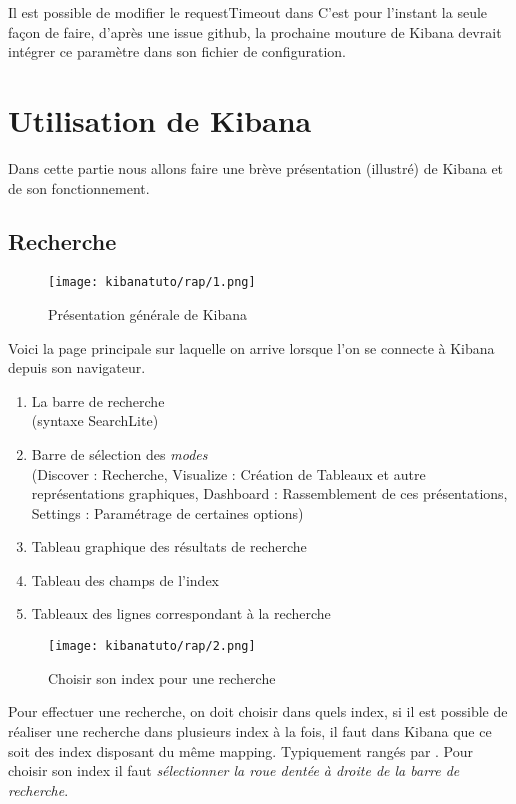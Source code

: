Il est possible de modifier le requestTimeout dans 
C'est pour l'instant la seule façon de faire, d'après une issue github, la prochaine 
mouture de Kibana devrait intégrer ce paramètre dans son fichier de configuration.

\section{Utilisation de Kibana}
Dans cette partie nous allons faire une brève présentation (illustré) de Kibana et
de son fonctionnement.

\subsection{Recherche}
\begin{figure}[H]
\center
\texttt{[image: kibanatuto/rap/1.png]}
\label{fig:kibanatuto1}
\caption{Présentation générale de Kibana}
\end{figure}

Voici la page principale sur laquelle on arrive lorsque l'on se connecte à Kibana
depuis son navigateur.

\begin{enumerate}
    \item La barre de recherche \\(syntaxe SearchLite)
    \item Barre de sélection des \emph{modes} \\(Discover : Recherche, Visualize : Création 
    de Tableaux et autre représentations graphiques, Dashboard : Rassemblement de
    ces présentations, Settings : Paramétrage de certaines options)
    \item Tableau graphique des résultats de recherche
    \item Tableau des champs de l'index
    \item Tableaux des lignes correspondant à la recherche
\end{enumerate}


\begin{figure}[H]
\center
\texttt{[image: kibanatuto/rap/2.png]}
\label{fig:kibanatuto2}
\caption{Choisir son index pour une recherche}
\end{figure}
Pour effectuer une recherche, on doit choisir dans quels index, si il est possible 
de réaliser une recherche dans plusieurs index à la fois, il faut dans Kibana que 
ce soit des index disposant du même mapping. Typiquement rangés par .
Pour choisir son index il faut \emph{sélectionner la roue dentée à droite de la barre
de recherche}.


